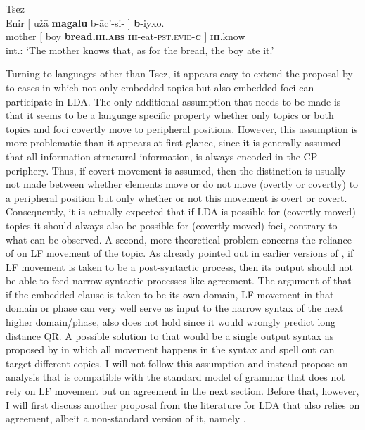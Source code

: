 \documentclass[output=paper
,modfonts
,nonflat]{langsci/langscibook}
\begin{document}
\begin{exe}
\ex Tsez \citep[][635]{Polinsky_Potsdam2001}\label{ex:tsez_comp_block_rep}\\
\gll *Enir [ u\v{z}\=a \textbf{magalu} b-\=ac’-si-\textbf{\textcrlambdain} ] \textbf{b}-iyxo.\\
mother [ boy \textbf{bread.\textsc{\textbf{iii}.abs}} \textsc{\textbf{iii}}-eat-\textsc{pst.evid}-\textsc{\textbf{c}} ]	\textsc{\textbf{iii}}.know\\
\glt int.: `The mother knows that, as for the bread, the boy ate it.'
\end{exe}
Turning to languages other than Tsez, it appears easy to extend the proposal by \citet{Polinsky_Potsdam2001} to cases in which not only embedded topics but also embedded foci can participate in LDA. The only additional assumption that needs to be made is that it seems to be a language specific property whether only topics or both topics and foci covertly move to peripheral positions. However, this assumption is more problematic than it appears at first glance, since it is generally assumed that all information-structural information, is always encoded in the CP-periphery. Thus, if covert movement is assumed, then the distinction is usually not made between whether elements move or do not move (overtly or covertly) to a peripheral position but only whether or not this movement is overt or covert. Consequently, it is actually expected that if LDA is possible for (covertly moved) topics it should always also be possible for (covertly moved) foci, contrary to what can be observed. A second, more theoretical problem concerns the reliance of \citet{Polinsky_Potsdam2001} on LF movement of the topic. As already pointed out in earlier versions of \citet{Bjorkman_Zeijlstra2014}, if LF movement is taken to be a post-syntactic process, then its output should not be able to feed narrow syntactic processes like agreement. The argument of \citet{Preminger_Polinsky2015} that if the embedded clause is taken to be its own domain, LF movement in that domain or phase can very well serve as input to the narrow syntax of the next higher domain/phase, also does not hold since it would wrongly predict long distance QR. A possible solution to that would be a single output syntax as proposed by \citet{Bobaljik2002} in which all movement happens in the syntax and spell out can target different copies. I will not follow this assumption and instead propose an analysis that is compatible with the standard model of grammar that does not rely on LF movement but on agreement in the next section. Before that, however, I will first discuss another proposal from the literature for LDA that also relies on agreement, albeit a non-standard version of it, namely \citet{Bjorkman_Zeijlstra2014}.
\end{document}

